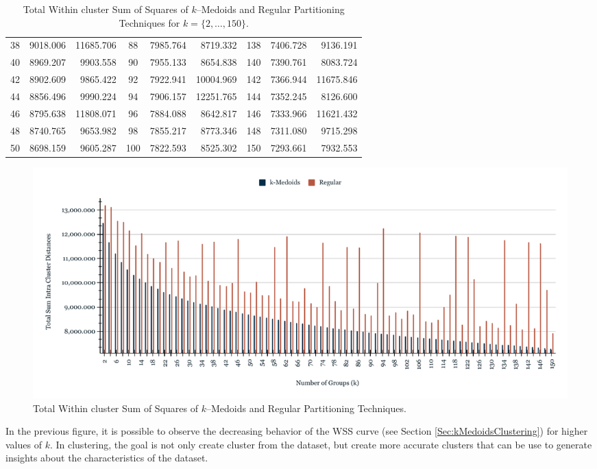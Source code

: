 \begin{table}[h]
\begin{tabular}{|c|r|r|c|r|r|c|r|r|}
		38 &  9018.006 & 11685.706 &  88 & 7985.764 &  8719.332 & 138 & 7406.728 &  9136.191 \\
		40 &  8969.207 &  9903.558 &  90 & 7955.133 &  8654.838 & 140 & 7390.761 &  8083.724 \\
		42 &  8902.609 &  9865.422 &  92 & 7922.941 & 10004.969 & 142 & 7366.944 & 11675.846 \\
		44 &  8856.496 &  9990.224 &  94 & 7906.157 & 12251.765 & 144 & 7352.245 &  8126.600 \\
		46 &  8795.638 & 11808.071 &  96 & 7884.088 &  8642.817 & 146 & 7333.966 & 11621.432 \\
		48 &  8740.765 &  9653.982 &  98 & 7855.217 &  8773.346 & 148 & 7311.080 &  9715.298 \\
		50 &  8698.159 &  9605.287 & 100 & 7822.593 &  8525.302 & 150 & 7293.661 &  7932.553 \\ \hline
		
	\end{tabular}
	\caption{Total Within cluster Sum of Squares of $k$--Medoids and Regular Partitioning Techniques for $k = \{2, \ldots, 150\}$.}
	\label{Table:TotalSumRegularkMedoids}
\end{table}


\begin{figure}[h]
	\centering
	\includegraphics[scale=0.46]{../Figures/Scaled-TotalSum-RegularKmedoids}
	\caption{Total Within cluster Sum of Squares of $k$--Medoids and Regular Partitioning Techniques.}
	\label{Fig:TotalSum-RegularKmedoids}
\end{figure}

In the previous figure, it is possible to observe the decreasing behavior of the WSS curve (see Section \ref{Sec:kMedoidsClustering}) for higher values of $k$. In clustering, the goal is not only create cluster from the dataset, but create more accurate clusters that can be use to generate insights about the characteristics of the dataset.

